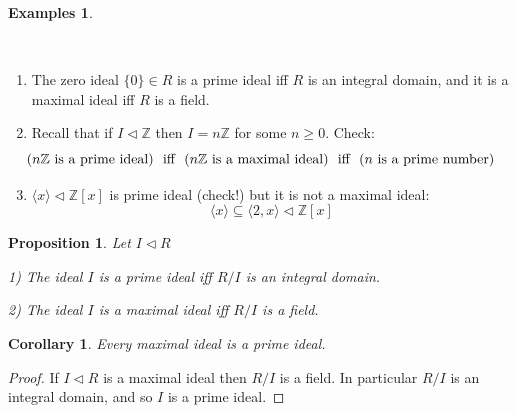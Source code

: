 \documentclass[12pt, letterpaper, oneside]{article}
\theoremstyle{plain}
\newtheorem{proposition}[theorem]{Proposition}
\newtheorem{corollary}[theorem]{Corollary}
\theoremstyle{definition}
\newtheorem{examples}[theorem]{Examples}
\newcommand{\Z}{{\mathbb Z}}
\newcommand{\subgp}[1]{\langle#1\rangle}
\newcommand{\benu}{\begin{enumerate}}
\newcommand{\eenu}{\end{enumerate}}
\newcommand{\vs}{\vskip 5mm}
\newcommand{\isep}[1][0]{\setlength{\itemsep}{#1 mm}}
\begin{document}
\begin{examples}\ 

\vskip -13mm

\ 
\benu
\isep[5]

\item The zero ideal $\{0\}\in R$ is a prime ideal iff $R$ is an integral domain, and it is a maximal 
ideal iff $R$ is a field. 

\item Recall that if $I \lhd  \Z$ then $I = n\Z$ for some $n\geq 0$. Check:
$$\hskip -5.5mm \text{($n\Z$ is a prime ideal) \ iff \ ($n\Z$ is a maximal ideal) \ iff \ ($n$ is a prime number)}$$

\item $\subgp{x}\lhd \Z[x]$ is prime ideal (check!) but it is not a maximal ideal:
$$\subgp{x} \subseteq \subgp{2, x} \lhd \Z[x]$$
\eenu
 
 \end{examples}
 
 \vs\vs
 
\begin{proposition}
\label{PROP_PRIMEMAXIDEALQUOT}
Let $I\lhd R$ 

1) The ideal $I$ is a prime ideal iff $R/I$ is an integral domain.

2) The ideal $I$ is a maximal ideal iff $R/I$ is a field. 

\end{proposition}

\vs\vs

\begin{corollary}
Every maximal ideal is a prime ideal. 
\end{corollary}

\vs

\begin{proof}
If $I\lhd R$ is a maximal ideal then $R/I$ is a field. In particular $R/I$ is an integral domain, and so 
$I$ is a prime ideal. 
\end{proof}

\vs\vs
\end{document}

